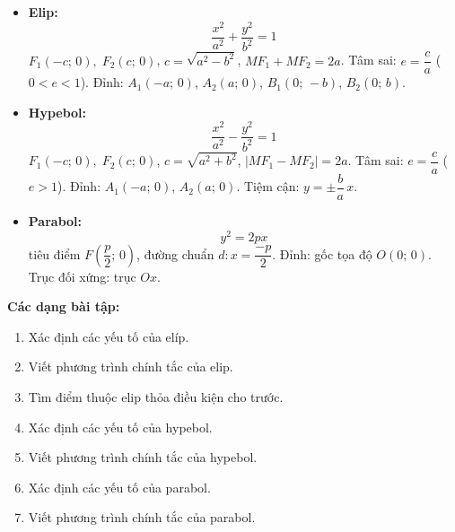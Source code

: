 \documentclass[12pt,a4paper]{article}
\begin{document}
\begin{congthuc}[title={Phương trình chính tắc}]
  \begin{itemize}
    \item \textbf{Elip:}
      \[
        \dfrac{x^2}{a^2} + \dfrac{y^2}{b^2} = 1
      \]
      $F_1(-c;\, 0),\; F_2(c;\, 0)$, $c = \sqrt{a^2 - b^2}$, $MF_1 + MF_2 = 2a$.
      Tâm sai: $e = \dfrac{c}{a}$ \;($0 < e < 1$). Đỉnh: $A_1(-a;\,0)$, $A_2(a;\,0)$, $B_1(0;\,-b)$, $B_2(0;\,b)$.
    \item \textbf{Hypebol:}
      \[
        \dfrac{x^2}{a^2} - \dfrac{y^2}{b^2} = 1
      \]
      $F_1(-c;\, 0),\; F_2(c;\, 0)$, $c = \sqrt{a^2 + b^2}$, $|MF_1 - MF_2| = 2a$.
      Tâm sai: $e = \dfrac{c}{a}$ \;($e > 1$). Đỉnh: $A_1(-a;\,0)$, $A_2(a;\,0)$. Tiệm cận: $y = \pm\dfrac{b}{a}\,x$.
    \item \textbf{Parabol:}
      \[
        y^2 = 2px
      \]
      tiêu điểm $F\!\left(\dfrac{p}{2};\, 0\right)$, đường chuẩn $d\colon x = \dfrac{-p}{2}$.
      Đỉnh: gốc tọa độ $O(0;\,0)$. Trục đối xứng: trục $Ox$.
  \end{itemize}
\end{congthuc}

\medskip\noindent\textbf{Các dạng bài tập:}
\begin{enumerate}[label=\textbf{Dạng \arabic*:}, leftmargin=*, align=left]
  \item Xác định các yếu tố của elíp.
  \item Viết phương trình chính tắc của elip.
  \item Tìm điểm thuộc elip thỏa điều kiện cho trước.
  \item Xác định các yếu tố của hypebol.
  \item Viết phương trình chính tắc của hypebol.
  \item Xác định các yếu tố của parabol.
  \item Viết phương trình chính tắc của parabol.
\end{enumerate}
\end{document}
